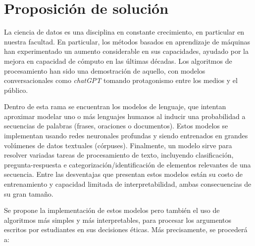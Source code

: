 \documentclass[
	spanish, %
	letterpaper, oneside
]{article}
\begin{document}
\section{Proposición de solución}

La ciencia de datos es una disciplina en constante crecimiento, en particular en nuestra facultad. En particular, los métodos basados en aprendizaje de máquinas han experimentado un aumento considerable en sus capacidades, ayudado por la mejora en capacidad de cómputo en las últimas décadas. Los algoritmos de procesamiento han sido una demostración de aquello, con modelos conversacionales como \textit{chatGPT} tomando protagonismo entre los medios y el público. 

\newp Dentro de esta rama se encuentran los modelos de lenguaje, que intentan aproximar modelar uno o más lenguajes humanos al inducir una probabilidad a secuencias de palabras (frases, oraciones o documentos). Estos modelos se implementan usando redes neuronales profundas y siendo entrenados en grandes volúmenes de datos textuales (córpuses). Finalmente, un modelo sirve para resolver variadas tareas de procesamiento de texto, incluyendo clasificación, pregunta-respuesta e categorización/identificación de elementos relevantes de una secuencia. Entre las desventajas que presentan estos modelos están su costo de entrenamiento y capacidad limitada de interpretabilidad, ambas consecuencias de su gran tamaño.

\newp Se propone la implementación de estos modelos pero también el uso de algoritmos más simples y más interpretables, para procesar los argumentos escritos por estudiantes en sus decisiones éticas. Más precisamente, se procederá a:
\end{document}
